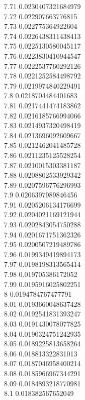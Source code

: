{7.71	0.0230407321684979\\
7.72	0.022907663776815\\
7.73	0.022775364922604\\
7.74	0.0226438311438413\\
7.75	0.0225130580045117\\
7.76	0.0223830410944547\\
7.77	0.0222537760292126\\
7.78	0.0221252584498792\\
7.79	0.0219974840229491\\
7.8	0.0218704484401683\\
7.81	0.0217441474183862\\
7.82	0.0216185766994066\\
7.83	0.0214937320498419\\
7.84	0.0213696092609667\\
7.85	0.0212462041485728\\
7.86	0.0211235125528254\\
7.87	0.0210015303381187\\
7.88	0.0208802533929342\\
7.89	0.0207596776296993\\
7.9	0.0206397989846456\\
7.91	0.0205206134176699\\
7.92	0.0204021169121944\\
7.93	0.0202843054750288\\
7.94	0.0201671751362326\\
7.95	0.0200507219489786\\
7.96	0.0199349419894173\\
7.97	0.0198198313565414\\
7.98	0.019705386172052\\
7.99	0.0195916025802251\\
8	0.0194784767477791\\
8.01	0.0193660048637428\\
8.02	0.0192541831393247\\
8.03	0.0191430078077825\\
8.04	0.0190324751242935\\
8.05	0.0189225813658264\\
8.06	0.018813322831013\\
8.07	0.0187046958400214\\
8.08	0.0185966967344291\\
8.09	0.0184893218770981\\
8.1	0.018382567652049\\
}

